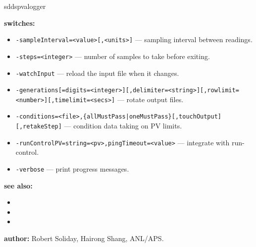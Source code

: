 \begin{sddsprog}{sddspvalogger}
\item \textbf{switches:}
\begin{itemize}
  \item {\tt -sampleInterval=<value>[,<units>]} --- sampling interval between readings.
  \item {\tt -steps=<integer>} --- number of samples to take before exiting.
  \item {\tt -watchInput} --- reload the input file when it changes.
  \item {\tt -generations[=digits=<integer>][,delimiter=<string>][,rowlimit=<number>][,timelimit=<secs>]} --- rotate output files.
  \item {\tt -conditions=<file>,\{allMustPass|oneMustPass\}[,touchOutput][,retakeStep]} --- condition data taking on PV limits.
  \item {\tt -runControlPV=string=<pv>,pingTimeout=<value>} --- integrate with run-control.
  \item {\tt -verbose} --- print progress messages.
\end{itemize}

\item \textbf{see also:}
\begin{itemize}
  \item {}
  \item {}
  \item {}
\end{itemize}
\item \textbf{author:} Robert Soliday, Hairong Shang, ANL/APS.
\end{sddsprog}
